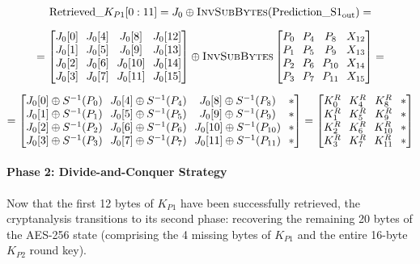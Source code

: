 \documentclass[11pt,a4paper]{report}
\begin{document}
\begin{equation}
\setlength{\arraycolsep}{3.5pt}
\begin{gathered}
    \text{Retrieved\_}K_{P1}[0:11] = J_0 \oplus \textsc{InvSubBytes}(\text{Prediction\_S1}_{\text{out}}) = \\[6pt]
    = \begin{bmatrix}
        J_0[0] & J_0[4] & J_0[8] & J_0[12] \\
        J_0[1] & J_0[5] & J_0[9] & J_0[13] \\
        J_0[2] & J_0[6] & J_0[10] & J_0[14] \\
        J_0[3] & J_0[7] & J_0[11] & J_0[15]
    \end{bmatrix}
    \oplus
    \textsc{InvSubBytes}
    \begin{bmatrix}
        P_0 & P_4 & P_8 & X_{12} \\
        P_1 & P_5 & P_9 & X_{13} \\
        P_2 & P_6 & P_{10} & X_{14} \\
        P_3 & P_7 & P_{11} & X_{15}
    \end{bmatrix} = \\[6pt]
    = \begin{bmatrix}
        J_0[0] \oplus S^{-1}(P_0) & J_0[4] \oplus S^{-1}(P_4) & J_0[8] \oplus S^{-1}(P_8) & * \\
        J_0[1] \oplus S^{-1}(P_1) & J_0[5] \oplus S^{-1}(P_5) & J_0[9] \oplus S^{-1}(P_9) & * \\
        J_0[2] \oplus S^{-1}(P_2) & J_0[6] \oplus S^{-1}(P_6) & J_0[10] \oplus S^{-1}(P_{10}) & * \\
        J_0[3] \oplus S^{-1}(P_3) & J_0[7] \oplus S^{-1}(P_7) & J_0[11] \oplus S^{-1}(P_{11}) & *
    \end{bmatrix}
    = \begin{bmatrix}
        K^R_0 & K^R_4 & K^R_8 & * \\
        K^R_1 & K^R_5 & K^R_9 & * \\
        K^R_2 & K^R_6 & K^R_{10} & * \\
        K^R_3 & K^R_7 & K^R_{11} & *
    \end{bmatrix}
\end{gathered}
\end{equation}

\newpage

\paragraph{Phase 2: Divide-and-Conquer Strategy}
Now that the first 12 bytes of $K_{P1}$ have been successfully retrieved, the cryptanalysis transitions to its second phase: 
recovering the remaining 20 bytes of the AES-256 state (comprising the 4 missing bytes of $K_{P1}$ and the entire 16-byte $K_{P2}$ round key).
\end{document}
